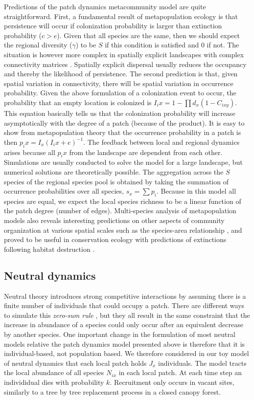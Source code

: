 \documentclass[12pt]{article}
\begin{document}
Predictions of the patch dynamics metacommunity model are quite straightforward.
First, a fundamental result of metapopulation ecology is that persistence will
occur if colonization probability is larger than extinction probability ($c>e$).
Given that all species are the same, then we should expect the regional
diversity ($\gamma$) to be $S$ if this condition is satisfied and $0$ if not.
The situation is however more complex in spatially explicit landscapes with
complex connectivity matrices \parencite{Hanski1998}. Spatially explicit
dispersal usually reduces the occupancy and thereby the likelihood of
persistence. The second prediction is that, given spatial variation in
connectivity, there will be spatial variation in occurrence probability. Given
the above formulation of a colonization event to occur, the probability that an
empty location is colonized is $I_ix=1-\prod d_x(1-C_{ixy})$. This equation
basically tells us that the colonization probability will increase
asymptotically with the degree of a patch (because of the product). It is easy
to show from metapopulation theory that the occurrence probability in a patch is
then $p_ix=I_x(I_ix+e)^{-1}$. The feedback between local and regional dynamics
arises because all $p_ix$ from the landscape are dependent from each other.
Simulations are usually conducted to solve the model for a large landscape, but
numerical solutions are theoretically possible. The aggregation across the $S$
species of the regional species pool is obtained by taking the summation of
occurrence probabilities over all species, $s_x = \sum{p_i}$. Because in this
model all species are equal, we expect the local species richness to be a linear
function of the patch degree (number of edges). Multi-species analysis of
metapopulation models also reveals interesting predictions on other aspects of
community organization at various spatial scales such as the species-area
relationship \parencite{Hanski1997}, and proved to be useful in conservation
ecology with predictions of extinctions following habitat destruction
\parencite{Tilman1994b,Rybicki2013}.

\subsection*{Neutral dynamics}

Neutral theory introduces strong competitive interactions by assuming there is a
finite number of individuals that could occupy a patch. There are different ways
to simulate this \emph{zero-sum rule} \parencite{Bell2000,Hubbell2001}, but they
all result in the same constraint that the increase in abundance of a species
could only occur after an equivalent decrease by another species. One important
change in the formulation of most neutral models relative the patch dynamics
model presented above is therefore that it is individual-based, not population
based. We therefore considered in our toy model of neutral dynamics that each
local patch holds $J_x$ individuals. The model tracts the local abundance of all
species $N_{ix}$ in each local patch. At each time step an individidual dies
with probability $k$. Recruitment only occurs in vacant sites, similarly to a
tree by tree replacement process in a closed canopy forest.
\end{document}
